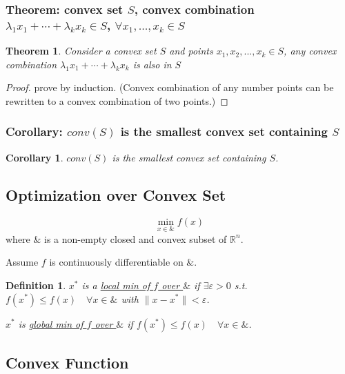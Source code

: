 \documentclass[11pt,a4paper]{article}
\newtheorem{theorem}{Theorem}
\newtheorem{corollary}{Corollary}
\newtheorem{definition}{Definition}
\begin{document}
\subsubsection{Theorem: convex set $S$, convex combination $\lambda_1 x_1+\cdots+\lambda_k x_k\in S$, $\forall x_1,...,x_k\in S$}
\begin{theorem}
Consider a convex set $S$ and points $x_1,x_2,...,x_k\in S$, any convex combination $\lambda_1 x_1+\cdots+\lambda_k x_k$ is also in $S$
\end{theorem}
\begin{proof}
prove by induction. (Convex combination of any number points can be rewritten to a convex combination of two points.)
\end{proof}

\subsubsection{Corollary: $conv(S)$ is the smallest convex set containing $S$}
\begin{corollary}
    $conv(S)$ is the smallest convex set containing $S$.
\end{corollary}

\subsection{Optimization over Convex Set}
$$\min_{x\in \&} f(x)$$
where $\&$ is a non-empty closed and convex subset of $\mathbb{R}^n$.

Assume $f$ is continuously differentiable on $\&$.

\begin{definition}
$x^*$ is a \underline{local min of $f$ over $\&$} if $\exists \varepsilon>0$ s.t. $f(x^*)\leq f(x)\quad \forall x\in \&$ with $\|x-x^*\|<\varepsilon$.

$x^*$ is \underline{global min of $f$ over $\&$} if $f(x^*)\leq f(x)\quad \forall x\in \&$.
\end{definition}


\subsection{Convex Function}
\end{document}
